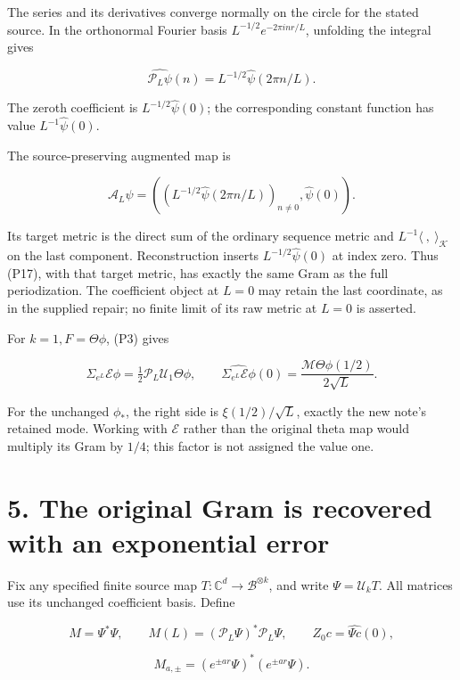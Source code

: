 \documentclass[
]{article}
\begin{document}
The series and its derivatives converge normally on the circle for the
stated source. In the orthonormal Fourier basis
\(L^{-1/2}e^{-2\pi i nr/L}\), unfolding the integral gives

\[
\widehat{\mathcal P_L\psi}(n)
=L^{-1/2}\widehat\psi(2\pi n/L).
\tag{P16}
\]

The zeroth coefficient is \(L^{-1/2}\widehat\psi(0)\); the corresponding
constant function has value \(L^{-1}\widehat\psi(0)\).

The source-preserving augmented map is

\[
\mathcal A_L\psi=
\left((L^{-1/2}\widehat\psi(2\pi n/L))_{n\ne0},\widehat\psi(0)\right).
\tag{P17}
\]

Its target metric is the direct sum of the ordinary sequence metric and
\(L^{-1}\langle\ ,\ \rangle_{\mathcal K}\) on the last component.
Reconstruction inserts \(L^{-1/2}\widehat\psi(0)\) at index zero. Thus
(P17), with that target metric, has exactly the same Gram as the full
periodization. The coefficient object at \(L=0\) may retain the last
coordinate, as in the supplied repair; no finite limit of its raw metric
at \(L=0\) is asserted.

For \(k=1,F=\Theta\phi\), (P3) gives

\[
\Sigma_{e^L}\mathcal E\phi
=\tfrac12\mathcal P_L\mathcal U_1\Theta\phi,
\qquad
\widehat{\Sigma_{e^L}\mathcal E\phi}(0)
=\frac{\mathcal M\Theta\phi(1/2)}{2\sqrt L}.
\tag{P18}
\]

For the unchanged \(\phi_*\), the right side is \(\xi(1/2)/\sqrt L\),
exactly the new note's retained mode. Working with \(\mathcal E\) rather
than the original theta map would multiply its Gram by \(1/4\); this
factor is not assigned the value one.

\section{5. The original Gram is recovered with an exponential
error}\label{the-original-gram-is-recovered-with-an-exponential-error}

Fix any specified finite source map
\(T:\mathbb C^d\to\mathscr B^{\otimes k}\), and write
\(\Psi=\mathcal U_kT\). All matrices use its unchanged coefficient
basis. Define

\[
M=\Psi^*\Psi,\qquad M(L)=(\mathcal P_L\Psi)^*\mathcal P_L\Psi,
\qquad Z_0c=\widehat{\Psi c}(0),
\tag{P19}
\]

\[
M_{a,\pm}=(e^{\pm ar}\Psi)^*(e^{\pm ar}\Psi).
\tag{P20}
\]
\end{document}
